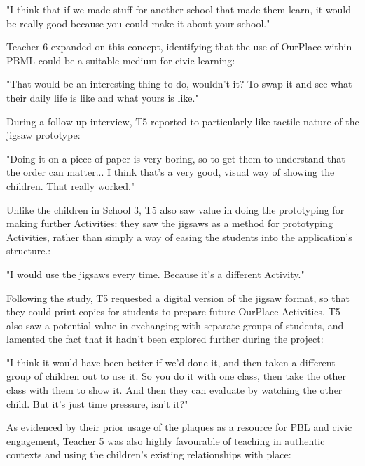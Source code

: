 \begin{displayquote}
"I think that if we made stuff for another school that made them learn, it would be really good because you could make it about your school."
\end{displayquote}

Teacher 6 expanded on this concept, identifying that the use of OurPlace within PBML could be a suitable medium for civic learning: 

\begin{displayquote}
"That would be an interesting thing to do, wouldn't it? To swap it and see what their daily life is like and what yours is like." 
\end{displayquote}

During a follow-up interview, T5 reported to particularly like tactile nature of the jigsaw prototype: 

\begin{displayquote}
"Doing it on a piece of paper is very boring, so to get them to understand that the order can matter... I think that's a very good, visual way of showing the children. That really worked."
\end{displayquote}

Unlike the children in School 3, T5 also saw value in doing the prototyping for making further Activities: they saw the jigsaws as a method for prototyping Activities, rather than simply a way of easing the students into the application's structure.: 

\begin{displayquote}
"I would use the jigsaws every time. Because it's a different Activity."
\end{displayquote}

Following the study, T5 requested a digital version of the jigsaw format, so that they could print copies for students to prepare future OurPlace Activities. T5 also saw a potential value in exchanging with separate groups of students, and lamented the fact that it hadn't been explored further during the project: 

\begin{displayquote}
"I think it would have been better if we'd done it, and then taken a different group of children out to use it. So you do it with one class, then take the other class with them to show it. And then they can evaluate by watching the other child. But it's just time pressure, isn't it?"
\end{displayquote}

As evidenced by their prior usage of the plaques as a resource for PBL and civic engagement, Teacher 5 was also highly favourable of teaching in authentic contexts and using the children's existing relationships with place: 

